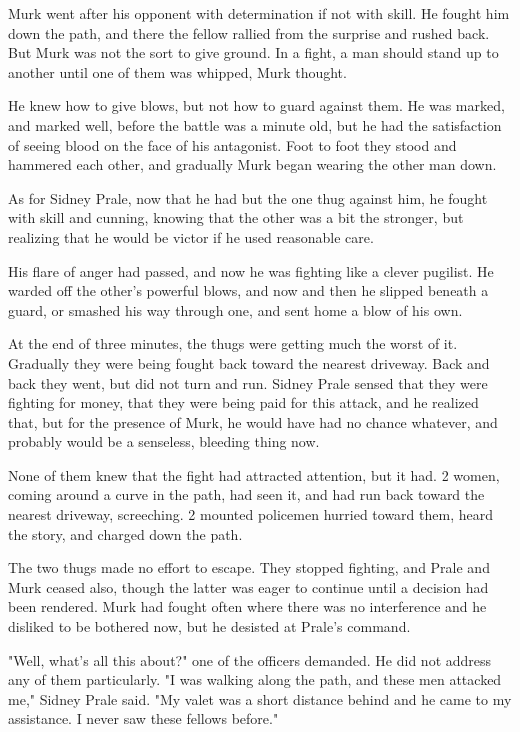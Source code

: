 \documentclass{novel}
\begin{document}
Murk went after his opponent with determination if not with skill. He fought him down the path, and there the fellow rallied from the surprise and rushed back. But Murk was not the sort to give ground. In a fight, a man should stand up to another until one of them was whipped, Murk thought.

He knew how to give blows, but not how to guard against them. He was marked, and marked well, before the battle was a minute old, but he had the satisfaction of seeing blood on the face of his antagonist. Foot to foot they stood and hammered each other, and gradually Murk began wearing the other man down.

As for Sidney Prale, now that he had but the one thug against him, he fought with skill and cunning, knowing that the other was a bit the stronger, but realizing that he would be victor if he used reasonable care.

His flare of anger had passed, and now he was fighting like a clever pugilist. He warded off the other's powerful blows, and now and then he slipped beneath a guard, or smashed his way through one, and sent home a blow of his own.

At the end of three minutes, the thugs were getting much the worst of it. Gradually they were being fought back toward the nearest driveway. Back and back they went, but did not turn and run. Sidney Prale sensed that they were fighting for money, that they were being paid for this attack, and he realized that, but for the presence of Murk, he would have had no chance whatever, and probably would be a senseless, bleeding thing now.

None of them knew that the fight had attracted attention, but it had. 2 women, coming around a curve in the path, had seen it, and had run back toward the nearest driveway, screeching. 2 mounted policemen hurried toward them, heard the story, and charged down the path.

The two thugs made no effort to escape. They stopped fighting, and Prale and Murk ceased also, though the latter was eager to continue until a decision had been rendered. Murk had fought often where there was no interference and he disliked to be bothered now, but he desisted at Prale's command.

"Well, what's all this about?" one of the officers demanded. He did not address any of them particularly. "I was walking along the path, and these men attacked me," Sidney Prale said. "My valet was a short distance behind and he came to my assistance. I never saw these fellows before."
\end{document}
